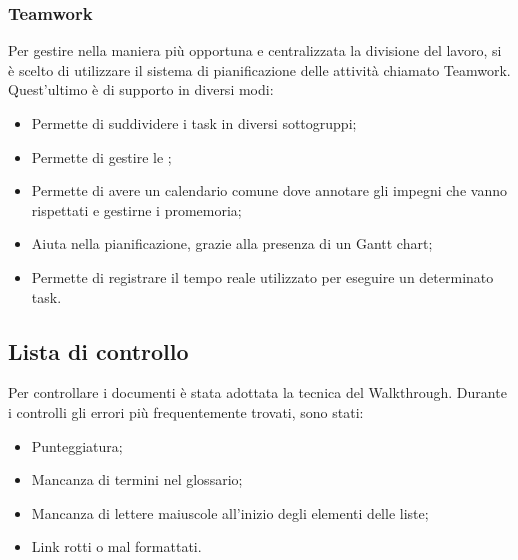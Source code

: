 \documentclass[../NormeDiProgetto.tex]{subfiles}
\begin{document}
\subsubsection{Teamwork}
Per gestire nella maniera più opportuna e centralizzata la divisione del lavoro, si è scelto di utilizzare il sistema di pianificazione delle attività chiamato Teamwork.
Quest'ultimo è di supporto in diversi modi:
\begin{itemize}
\item Permette di suddividere i task in diversi sottogruppi;
\item Permette di gestire le ;
\item Permette di avere un calendario comune dove annotare gli impegni che vanno rispettati e gestirne i promemoria;
\item Aiuta nella pianificazione, grazie alla presenza di un Gantt chart;
\item Permette di registrare il tempo reale utilizzato per eseguire un determinato task.
\end{itemize}

\subsection{Lista di controllo}
Per controllare i documenti è stata adottata la tecnica del Walkthrough.
Durante i controlli gli errori più frequentemente trovati, sono stati:
\begin{itemize}
	\item Punteggiatura;
	\item Mancanza di termini nel glossario;
	\item Mancanza di lettere maiuscole all'inizio degli elementi delle liste;
	\item Link rotti o mal formattati.
\end{itemize}
\end{document}
